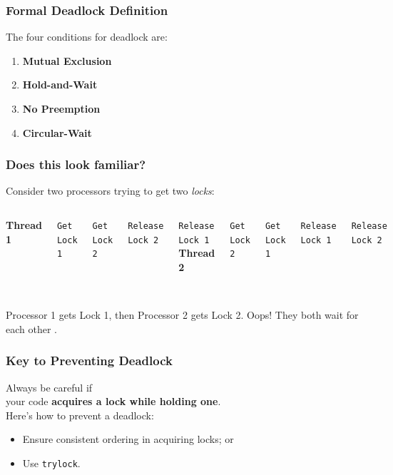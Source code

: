 \begin{frame}
\frametitle{Formal Deadlock Definition}

The four conditions for deadlock are:

\begin{enumerate}
	\item \textbf{Mutual Exclusion}
	\item \textbf{Hold-and-Wait}
	\item \textbf{No Preemption}
	\item \textbf{Circular-Wait}
\end{enumerate}



\end{frame}

\begin{frame}[containsverbatim]
  \frametitle{Does this look familiar?}

  
     Consider two processors trying to get two {\it locks}:
     
     \vfill
  \begin{columns}
      {\bf Thread 1}

      \verb+Get Lock 1+

      \verb+Get Lock 2+

      \verb+Release Lock 2+

      \verb+Release Lock 1+
      {\bf Thread 2}

      \verb+Get Lock 2+

      \verb+Get Lock 1+

      \verb+Release Lock 1+

      \verb+Release Lock 2+
    \end{columns}~\\[1em]
     Processor 1 gets Lock 1, then Processor 2 gets Lock 2. Oops!
          They both wait for each other .
  
\end{frame}

\begin{frame}
  \frametitle{Key to Preventing Deadlock}

  

  Always be careful if \\
your code {\bf acquires a lock while holding one}.\\[1em]

  Here's how to prevent a deadlock:
  
  \begin{itemize}
    \item Ensure consistent ordering in acquiring locks; or
    \item Use {\tt trylock}.
  \end{itemize}
  
\end{frame}

